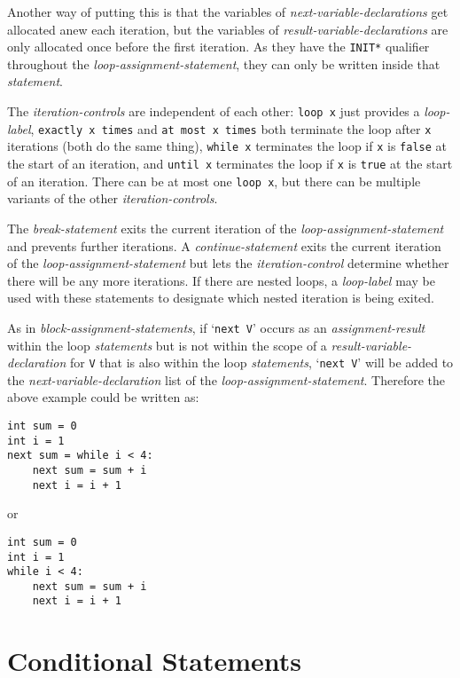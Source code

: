 \documentclass[12pt]{article}
\newenvironment{indpar}[1][0.3in]%
	{\begin{list}{}%
		     {\setlength{\itemsep}{0in}%
		      \setlength{\topsep}{0in}%
		      \setlength{\parsep}{1ex}%
		      \setlength{\labelwidth}{#1}%
		      \setlength{\leftmargin}{#1}%
		      \addtolength{\leftmargin}{\labelsep}}%
	 \item}%
	{\end{list}}
\begin{document}
Another way of putting this is that the variables of
{\em next-variable-declarations} get allocated anew each
iteration, but the variables of {\em result-variable-declarations}
are only allocated once before the first iteration.  As they
have the {\tt *INIT*} qualifier throughout the
{\em loop-assignment-statement}, they can only be written
inside that {\em statement}.

The {\em iteration-controls} are independent of each other:
{\tt loop x} just provides a {\em loop-label},
{\tt exactly x times} and {\tt at most x times} both terminate
the loop after {\tt x} iterations (both do the same thing),
{\tt while x} terminates
the loop if {\tt x} is {\tt false} at the start of an iteration,
and {\tt until x} terminates
the loop if {\tt x} is {\tt true} at the start of an iteration.
There can be at most one {\tt loop x}, but there can be multiple
variants of the other {\em iteration-controls}.

The {\em break-statement} exits the current iteration of the
{\em loop-assignment-statement} and prevents further iterations.
A {\em continue-statement} exits the current iteration of the
{\em loop-assignment-statement} but lets the
{\em iteration-control} determine whether there will be any
more iterations.  If there are nested loops, a {\em loop-label}
may be used with these statements to designate which nested iteration
is being exited.

\label{LOOP-NEXT-PROMOTION}
As in {\em block-assignment-statements}, if `{\tt next V}' occurs
as an {\em assignment-result} within the loop {\em statements}
but is not within the scope of a {\em result-variable-declaration}
for {\tt V} that is also within the loop {\em statements},
`{\tt next V}' will be added to the {\em next-variable-declaration}
list of the {\em loop-assignment-statement}.  Therefore the
above example could be written as:
\begin{indpar}\begin{verbatim}
int sum = 0
int i = 1
next sum = while i < 4:
    next sum = sum + i
    next i = i + 1
\end{verbatim}\end{indpar}
or
\begin{indpar}\begin{verbatim}
int sum = 0
int i = 1
while i < 4:
    next sum = sum + i
    next i = i + 1
\end{verbatim}\end{indpar}

\section{Conditional Statements}
\label{CONDITIONAL-STATEMENTS}
\end{document}
